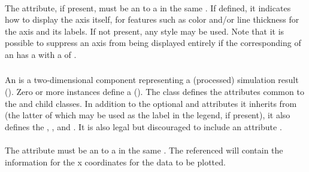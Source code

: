 \begin{blockChanged}
\paragraph*{}
The  attribute, if present, must be an \SIdRef to a \Style in the same \SedDocument.  If defined, it indicates how to display the axis itself, for features such as color and/or line thickness for the axis and its labels.  If not present, any style may be used.  Note that it is possible to suppress an axis from being displayed entirely if the corresponding \Style of an \Axis has a  with a  of .



\subsubsection{}
\label{class:abstractCurve}
An \AbstractCurve is a two-dimensional \Output component representing a (processed) simulation result (). Zero or more \AbstractCurve instances define a \PlotTwo ().  The \AbstractCurve class defines the attributes common to the \Curve and \ShadedArea child classes.  In addition to the optional  and  attributes it inherits from \SedBase (the latter of which may be used as the label in the \Plot legend, if present), it also defines the  , , and .  It is also legal but discouraged to include an attribute .


\paragraph*{}
The  attribute must be an \SIdRef to a \DataGenerator in the same \SedDocument.  The referenced \DataGenerator will contain the information for the x coordinates for the data to be plotted.  


\end{blockChanged}
